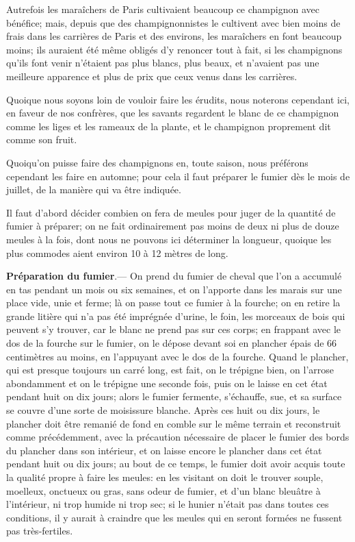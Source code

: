\documentclass[10pt,a4paper]{book}
\begin{document}
Autrefois les maraîchers de Paris cultivaient beaucoup ce champignon avec bénéfice; mais, depuis que des champignonnistes le cultivent avec bien moins de frais dans les carrières de Paris et des environs, les maraîchers en font beaucoup moins; ils auraient été même obligés d'y renoncer tout à fait, si les champignons qu'ils font venir n'étaient pas plus blancs, plus beaux, et n'avaient pas une meilleure apparence et plus de prix que ceux venus dans les carrières.

Quoique nous soyons loin de vouloir faire les érudits, nous noterons cependant ici, en faveur de nos confrères, que les savants regardent le blanc de ce champignon comme les liges et les rameaux de la plante, et le champignon proprement dit comme son fruit.

Quoiqu'on puisse faire des champignons en, toute saison, nous préférons cependant les faire en automne; pour cela il faut préparer le fumier dès le mois de juillet, de la manière qui va être indiquée.

Il faut d'abord décider combien on fera de meules pour juger de la quantité de fumier à préparer; on ne fait ordinairement pas moins de deux ni plus de douze meules à la fois, dont nous ne pouvons ici déterminer la longueur, quoique les plus commodes aient environ 10 à 12 mètres de long.

\textbf{Préparation du fumier}.--- On prend du fumier de cheval que l'on a accumulé en tas pendant un mois ou six semaines, et on l'apporte dans les marais sur une place vide, unie et ferme; là on passe tout ce fumier à la fourche; on en retire la grande litière qui n'a pas été imprégnée d'urine, le foin, les morceaux de bois qui peuvent s'y trouver, car le blanc ne prend pas sur ces corps; en frappant avec le dos de la fourche sur le fumier, on le dépose devant soi en plancher épais de 66 centimètres au moins, en l'appuyant avec le dos de la fourche. Quand le plancher, qui est presque toujours un carré long, est fait, on le trépigne bien, on l'arrose abondamment et on le trépigne une seconde fois, puis on le laisse en cet état pendant huit on dix jours; alors le fumier fermente, s'échauffe, sue, et sa surface se couvre d'une sorte de moisissure blanche. Après ces huit ou dix jours, le plancher doit être remanié de fond en comble sur le même terrain et reconstruit comme précédemment, avec la précaution nécessaire de placer le fumier des bords du plancher dans son intérieur, et on laisse encore le plancher dans cet état pendant huit ou dix jours; au bout de ce temps, le fumier doit avoir acquis toute la qualité propre à faire les meules: en les visitant on doit le trouver souple, moelleux, onctueux ou gras, sans odeur de fumier, et d'un blanc bleuâtre à l'intérieur, ni trop humide ni trop sec; si le hunier n'était pas dans toutes ces conditions, il y aurait à craindre que les meules qui en seront formées ne fussent pas très-fertiles.
\end{document}
